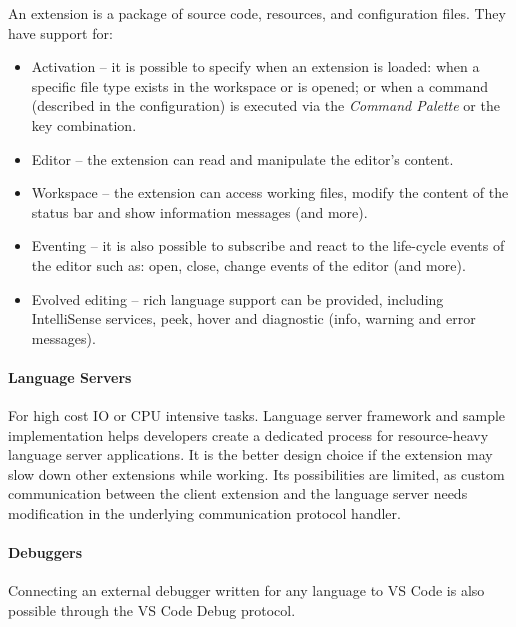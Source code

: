 An extension is a package of source code, resources, and configuration files. They have support for:
\begin{itemize}[topsep=0pt]
  \item Activation -- it is possible to specify when an extension is loaded: when a specific file type exists in the workspace or is opened; or when a command (described in the configuration) is executed via the \emph{Command Palette} or the key combination.
  \item Editor -- the extension can read and manipulate the editor's content.
  \item Workspace -- the extension can access working files, modify the content of the status bar and show information messages (and more).
  \item Eventing -- it is also possible to subscribe and react to the life-cycle events of the editor such as: open, close, change events of the editor (and more).
  \item Evolved editing -- rich language support can be provided, including IntelliSense services, peek, hover and diagnostic (info, warning and error messages).
\end{itemize}

\paragraph{Language Servers} For high cost IO or CPU intensive tasks.
Language server framework and sample implementation helps developers create a dedicated process for resource-heavy language server applications. It is the better design choice if the extension may slow down other extensions while working. Its possibilities are limited, as custom communication between the client extension and the language server needs modification in the underlying communication protocol handler.

\paragraph{Debuggers} Connecting an external debugger written for any language to VS Code is also possible through the VS Code Debug protocol.
